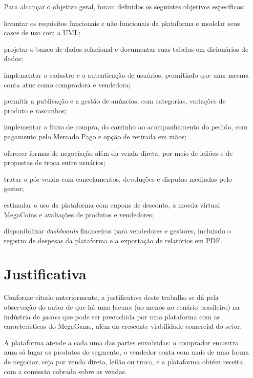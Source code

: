 \documentclass[
  12pt,
  a4paper,
  oneside,
  chapter=TITLE,
  subsection=TITLE,
  sumario=abnt-6027-2012,
  english,
  brazil
]{abntex2}
\begin{document}
Para alcançar o objetivo geral, foram definidos os seguintes objetivos
específicos:

\begin{alineas}
  \item levantar os requisitos funcionais e não funcionais da plataforma e
  modelar seus casos de uso com a UML;
  \item projetar o banco de dados relacional e documentar suas tabelas em
  dicionários de dados;
  \item implementar o cadastro e a autenticação de usuários, permitindo
  que uma mesma conta atue como compradora e vendedora;
  \item permitir a publicação e a gestão de anúncios, com categorias,
  variações de produto e rascunhos;
  \item implementar o fluxo de compra, do carrinho ao acompanhamento do
  pedido, com pagamento pelo Mercado Pago e opção de retirada em mãos;
  \item oferecer formas de negociação além da venda direta, por meio de
  leilões e de propostas de troca entre usuários;
  \item tratar o pós-venda com cancelamentos, devoluções e disputas
  mediadas pelo gestor;
  \item estimular o uso da plataforma com cupons de desconto, a moeda
  virtual MegaCoins e avaliações de produtos e vendedores;
  \item disponibilizar \emph{dashboards} financeiros para vendedores e
  gestores, incluindo o registro de despesas da plataforma e a exportação
  de relatórios em PDF.
\end{alineas}

\section{Justificativa}

Conforme citado anteriormente, a justificativa deste trabalho se dá pela
observação do autor de que há uma lacuna (ao menos no cenário
brasileiro) na indústria de \emph{games} que pode ser preenchida por uma
plataforma com as características do MegaGame, além da crescente
viabilidade comercial do setor.

A plataforma atende a cada uma das partes envolvidas: o comprador
encontra num só lugar os produtos do segmento, o vendedor conta com mais
de uma forma de negociar, seja por venda direta, leilão ou troca, e a
plataforma obtém receita com a comissão cobrada sobre as vendas.
\end{document}
